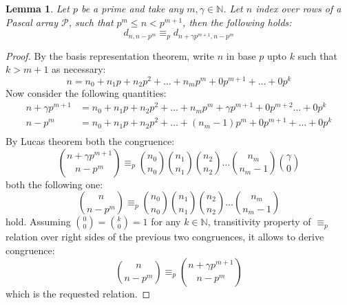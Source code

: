 \documentclass[10pt,a4paper]{article} %
\newtheorem{lemma}[theorem]{Lemma}
\begin{document}
    \begin{lemma}
        Let $p$ be a prime and take any $m, \gamma \in \mathbb{N}$. Let $n$ index
        over rows of a Pascal array $\mathcal{P}$, such that $p^{m} \leq n < p^{m+1}$, then the following holds:
        \begin{displaymath}
            d_{n,n-p^{m}} \equiv_{p} d_{n+\gamma p^{m+1}, n-p^{m}}
        \end{displaymath}
    \end{lemma}
    \begin{proof} %
        By the basis representation theorem, write $n$  in base $p$ upto $k$ such that $k > m+1$ as necessary:
        \begin{displaymath}
            n = n_{0} + n_{1}p + n_{2}p^2 + \ldots + n_{m}p^m + 0p^{m+1} + \ldots + 0p^k
        \end{displaymath}
        Now consider the following quantities:
        \begin{displaymath}
            \begin{split}
                n +\gamma p^{m+1} &= n_{0} + n_{1}p + n_{2}p^2 + \ldots + n_{m}p^m + \gamma p^{m+1} + 0p^{m+2} \ldots + 0p^k \\
                n - p^{m} &= n_{0} + n_{1}p + n_{2}p^2 + \ldots + (n_{m}-1)p^m + 0p^{m+1} + \ldots + 0p^k \\
            \end{split}
        \end{displaymath}
        By Lucas theorem both the congruence:
        \begin{displaymath}
            {{n+\gamma p^{m+1}} \choose { n - p^{m}}} \equiv_{p} 
                {{n_{0}} \choose {n_{0}}}  
                {{n_{1}} \choose {n_{1}}} 
                {{n_{2}} \choose {n_{2}}}
                \ldots
                {{n_{m}} \choose {n_{m}-1}} 
                {{\gamma} \choose {0}} 
        \end{displaymath}
        both the following one:
        \begin{displaymath}
            {{n} \choose { n - p^{m}}} \equiv_{p} 
                {{n_{0}} \choose {n_{0}}}  
                {{n_{1}} \choose {n_{1}}} 
                {{n_{2}} \choose {n_{2}}}
                \ldots
                {{n_{m}} \choose {n_{m}-1}} 
        \end{displaymath}
        hold. Assuming ${{0}\choose{0}} = {{k}\choose{0}} = 1$ for any $k\in\mathbb{N}$, 
        transitivity property of $\equiv_p$ relation over right sides of
        the previous two congruences, it allows to derive congruence:
        \begin{displaymath}
            {{n} \choose { n - p^{m}}} \equiv_{p} {{n+\gamma p^{m+1}} \choose { n - p^{m}}} 
        \end{displaymath}
        which is the requested relation.
    \end{proof}
\end{document}
